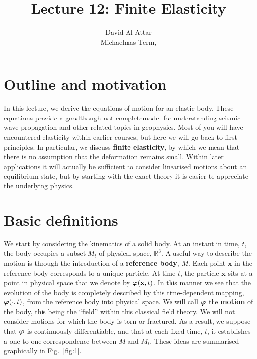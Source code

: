 \documentclass[a4paper,12pt]{paper}
\providecommand{\DIFadd}[1]{{\protect\color{blue}\uwave{#1}}} %
\providecommand{\DIFaddbegin}{} %
\providecommand{\DIFaddend}{} %
\providecommand{\DIFdelbegin}{} %
\providecommand{\DIFdelend}{} %
\begin{document}
\title{Lecture 12: Finite Elasticity}
\author{David Al-Attar \\ Michaelmas Term, \the\year}



\maketitle
\DIFdelbegin %

\DIFdelend \section*{Outline and motivation}
In this lecture, we derive the equations of motion for an elastic body. These equations provide a good\DIFaddbegin \DIFadd{, }\DIFaddend though not
complete\DIFaddbegin \DIFadd{, }\DIFaddend model for understanding seismic wave propagation and other related topics in geophysics. Most of you will
have encountered elasticity within earlier courses, but here we will go back to first principles. In particular, we
discuss \textbf{finite elasticity}, by which we mean that there is no assumption that the deformation remains small.
Within later applications it will actually be sufficient to consider linearised motions about an equilibrium state, but
by starting with the exact theory it is easier to appreciate the underlying physics.

\section*{Basic definitions}
We start by considering the kinematics of a solid body. At an instant in time, $t$, the body occupies a subset $M_{t}$ 
of physical space, $\mathbb{R}^{3}$. A useful way to describe the motion is through the introduction of a \textbf{reference body}, 
$M$. Each point $\mathbf{x}$ in the reference body corresponds to a unique particle. At time $t$, the particle $\mathbf{x}$ 
sits at a point in physical space that we denote by $\bm{\varphi}(\mathbf{x},t)$. In this manner we see that the evolution of the 
body is completely described by this time-dependent mapping, $\bm{\varphi}(\cdot,t)$, from the reference body into physical space.
We will call $\bm{\varphi}$ the \textbf{motion} of the body, this being the ``field'' within this classical field theory. We will not
consider motions for which the body is torn or fractured. As a result, we suppose that $\bm{\varphi}$ is continuously differentiable,
and that at each fixed time, $t$, it establishes a one-to-one correspondence between $M$ and $M_{t}$. These ideas are summarised 
graphically in Fig.~\ref{fig:1}.
\end{document}
